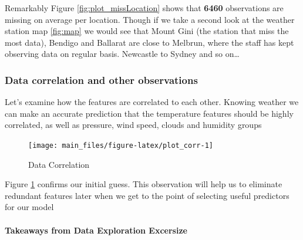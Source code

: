 Remarkably Figure \ref{fig:plot_missLocation} shows that \textbf{6460}
observations are missing on average per location. Though if we take a
second look at the weather station map \ref{fig:map} we would see that
Mount Gini (the station that miss the most data), Bendigo and Ballarat
are close to Melbrun, where the staff has kept observing data on regular
basis. Newcastle to Sydney and so on\ldots{}

\hypertarget{data-correlation-and-other-observations}{%
\subsubsection{Data correlation and other
observations}\label{data-correlation-and-other-observations}}

Let's examine how the features are correlated to each other. Knowing
weather we can make an accurate prediction that the temperature features
should be highly correlated, as well as pressure, wind speed, clouds and
humidity groups

\begin{Schunk}
\begin{figure}[H]

{\centering \texttt{[image: main\_files/figure-latex/plot\_corr-1]} 

}

\caption[Data Correlation]{Data Correlation}\label{fig:plot_corr}
\end{figure}
\end{Schunk}

Figure \ref{fig:plot_corr} confirms our initial guess. This observation
will help us to eliminate redundant features later when we get to the
point of selecting useful predictors for our model

\hypertarget{takeaways-from-data-exploration-excersize}{%
\paragraph{Takeaways from Data Exploration
Excersize}\label{takeaways-from-data-exploration-excersize}}

